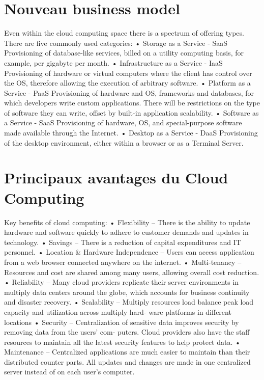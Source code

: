 \section{Nouveau business model}

Even within the cloud computing space there is a spectrum of offering types. There are five commonly used categories:
•  Storage as a Service - SaaS
Provisioning of database-like services, billed on a utility computing basis, for
example, per gigabyte per month.
•  Infrastructure as a Service - IaaS
Provisioning of hardware or virtual computers where the client has control over the OS, therefore allowing the execution of arbitrary software.
•  Platform as a Service - PaaS
Provisioning of hardware and OS, frameworks and databases, for which developers write custom applications. There will be restrictions on the type of software they can write, offset by built-in application scalability.
•  Software as a Service - SaaS
Provisioning of hardware, OS, and special-purpose software made available
through the Internet.
•  Desktop as a Service - DaaS
Provisioning of the desktop environment, either within a browser or as a Terminal Server.

\section{Principaux avantages du Cloud Computing}
Key benefits of cloud computing:
• Flexibility – There is the ability to update hardware and software quickly to adhere to customer demands and updates in technology.
• Savings – There is a reduction of capital expenditures and IT personnel.
• Location \& Hardware Independence – Users can access application from a web browser connected anywhere on the internet.
• Multi-tenancy – Resources and cost are shared among many users, allowing overall cost reduction.
• Reliability – Many cloud providers replicate their server environments in multiply data centers around the globe, which accounts for business continuity and disaster recovery.
• Scalability – Multiply resources load balance peak load capacity and utilization across multiply hard- ware platforms in different locations
• Security – Centralization of sensitive data improves security by removing data from the users’ com- puters. Cloud providers also have the staff resources to maintain all the latest security features to help protect data.
• Maintenance – Centralized applications are much easier to maintain than their distributed counter parts. All updates and changes are made in one centralized server instead of on each user’s computer.


